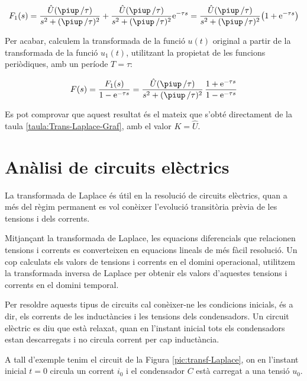 \begin{exemple}
    \[
        F_1(s) = \frac{\hat{U} (\piup\,/\tau)}{s^2 + (\piup\,/\tau)^2} +
        \frac{\hat{U} (\piup\,/\tau)}{s^2 + (\piup\,/\tau)^2} \eu^{-\tau s} =
        \frac{\hat{U} (\piup\,/\tau)}{s^2 + (\piup\,/\tau)^2} \bigl( 1+\eu^{-\tau s}
        \big)
    \]

    Per acabar, calculem la transformada de la funció $u(t)$ original a
    partir de la transformada de la funció $u_1(t)$, utilitzant la
    propietat de les funcions periòdiques, amb un període $T=\tau$:

    \[
        F(s) = \frac{F_1(s)}{1-\eu^{-\tau s}} =
        \frac{\hat{U} (\piup\,/\tau) }{s^2 + (\piup\,/\tau)^2}\,\frac{1+\eu^{-\tau s}}{1-\eu^{-\tau
        s}}
    \]

    Es pot comprovar que aquest resultat és el mateix que s'obté directament de la taula \vref{taula:Trans-Laplace-Graf}, amb el valor $K=\hat{U}$.
\end{exemple}

\section{Anàlisi de circuits elèctrics}

La transformada de Laplace és útil en la resolució de circuits
elèctrics, quan a més del règim permanent es vol conèixer
l'evolució transitòria prèvia de les tensions i dels corrents.

Mitjançant la transformada de Laplace, les equacions diferencials
que relacionen tensions i corrents es converteixen en equacions
lineals de més fàcil resolució. Un cop calculats els valors de
tensions i corrents en el domini operacional, utilitzem la
transformada inversa de Laplace per obtenir els valors d'aquestes
tensions i corrents en el domini temporal.

Per  resoldre aquests tipus de circuits cal conèixer-ne les
condicions inicials, és a dir, els corrents de les inductàncies i
les tensions dels condensadors. Un circuit elèctric es diu que està
relaxat, quan en l'instant inicial tots els condensadors estan
descarregats i no circula corrent per cap inductància.

A tall d'exemple tenim el circuit de la Figura
\vref{pic:transf-Laplace}, on en l'instant inicial $t=0$ circula un
corrent $i_0$ i el condensador $C$ està carregat a una tensió $u_0$.

\begin{center}
    
    \label{pic:transf-Laplace}
\end{center}

